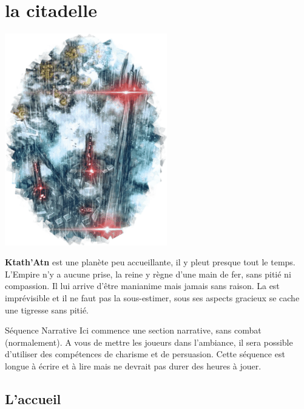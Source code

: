 \section{la citadelle}

\includegraphics[width=200pt]{_img/places/citadel-of-ktath-atn.png}

\textbf{Ktath’Atn} est une planète peu accueillante, il y pleut presque tout le temps. L’Empire n’y a aucune prise, la reine y règne d’une main de fer, sans pitié ni compassion. Il lui arrive d’être manianime mais jamais sans raison. La  est imprévisible et il ne faut pas la sous-estimer, sous ses aspects gracieux se cache une tigresse sans pitié.

\begin{paperbox}{Séquence Narrative}
Ici commence une section narrative, sans combat (normalement). A vous de mettre les joueurs dans l’ambiance, il sera possible d’utiliser des compétences de charisme et de persuasion. Cette séquence est longue à écrire et à lire mais ne devrait pas durer des heures à jouer.
\end{paperbox}

\subsection{L’accueil}


